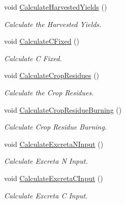 \begin{DoxyCompactItemize}
\mbox{\label{class_crop_class_a02876da625301864f21b46da5a6f4e84}} 
void \mbox{\hyperlink{class_crop_class_a02876da625301864f21b46da5a6f4e84}{Calculate\+Harvested\+Yields}} ()
\begin{DoxyCompactList}\small\item\em Calculate the Harvested Yields. \end{DoxyCompactList}\item 
\mbox{\label{class_crop_class_a6621718e2097460667080dc68dc00b4d}} 
void \mbox{\hyperlink{class_crop_class_a6621718e2097460667080dc68dc00b4d}{Calculate\+C\+Fixed}} ()
\begin{DoxyCompactList}\small\item\em Calculate C Fixed. \end{DoxyCompactList}\item 
\mbox{\label{class_crop_class_a37721141ba2db316dc8a5f0c4f91d2bf}} 
void \mbox{\hyperlink{class_crop_class_a37721141ba2db316dc8a5f0c4f91d2bf}{Calculate\+Crop\+Residues}} ()
\begin{DoxyCompactList}\small\item\em Calculate the Crop Residues. \end{DoxyCompactList}\item 
\mbox{\label{class_crop_class_ad07cc1a644d7c6987571094a60c4af94}} 
void \mbox{\hyperlink{class_crop_class_ad07cc1a644d7c6987571094a60c4af94}{Calculate\+Crop\+Residue\+Burning}} ()
\begin{DoxyCompactList}\small\item\em Calculate Crop Residue Burning. \end{DoxyCompactList}\item 
void \mbox{\hyperlink{class_crop_class_acd893cea7f299839620d4e0556b36cc8}{Calculate\+Excreta\+N\+Input}} ()
\begin{DoxyCompactList}\small\item\em Calculate Excreta N Input. \end{DoxyCompactList}\item 
void \mbox{\hyperlink{class_crop_class_aa846428c46858858c7eda67db3cbbb0b}{Calculate\+Excreta\+C\+Input}} ()
\begin{DoxyCompactList}\small\item\em Calculate Excreta C Input. \end{DoxyCompactList}\item 

\end{DoxyCompactItemize}
